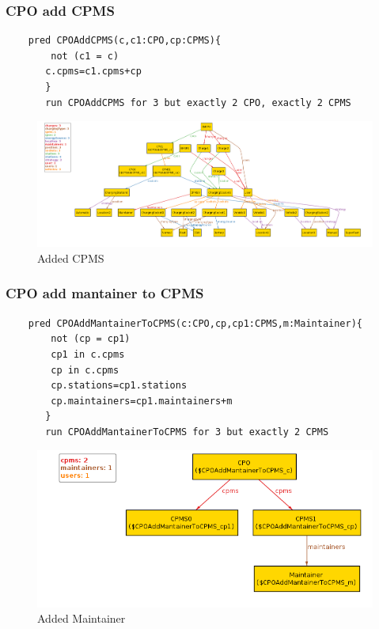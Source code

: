 \subsubsection{CPO add CPMS}
\begin{verbatim}
    pred CPOAddCPMS(c,c1:CPO,cp:CPMS){
        not (c1 = c)
       c.cpms=c1.cpms+cp
       }
       run CPOAddCPMS for 3 but exactly 2 CPO, exactly 2 CPMS    
\end{verbatim}
\begin{figure}[H]
    \includegraphics[keepaspectratio, width=16cm]{Alloy/CPOAddCPMS.png}
    \caption{Added CPMS}
\end{figure}

\subsubsection{CPO add mantainer to CPMS}
\begin{verbatim}
    pred CPOAddMantainerToCPMS(c:CPO,cp,cp1:CPMS,m:Maintainer){
        not (cp = cp1)
        cp1 in c.cpms
        cp in c.cpms
        cp.stations=cp1.stations
        cp.maintainers=cp1.maintainers+m
       }
       run CPOAddMantainerToCPMS for 3 but exactly 2 CPMS    
\end{verbatim}
\begin{figure}[H]
    \includegraphics[keepaspectratio, width=16cm]{Alloy/CPoAddMaintainer.png}
    \caption{Added Maintainer}
\end{figure}

